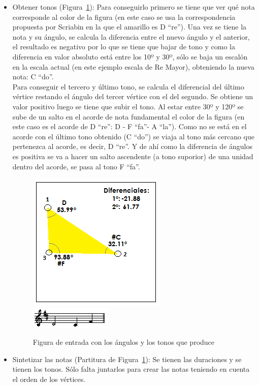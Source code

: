 \begin{itemize}
	\item Obtener tonos  (Figura~\ref{fig:Figura4Voz1}): Para conseguirlo primero se tiene que ver qué nota corresponde al color de la figura (en este caso se usa la correspondencia propuesta por Scriabin en la que el amarillo es D ``re''). Una vez se tiene la nota y su ángulo, se calcula la diferencia entre el nuevo ángulo y el anterior, el resultado es negativo por lo que se tiene que bajar de tono y como la diferencia en valor absoluto está entre los 10º y 30º, sólo se baja un escalón en la escala actual (en este ejemplo escala de Re Mayor), obteniendo la nueva nota: C ``do''. \\
Para conseguir el tercero y último tono, se calcula el diferencial del último vértice restando el ángulo del tercer vértice con el del segundo. Se obtiene un valor positivo luego se tiene que subir el tono. Al estar entre 30º y 120º se sube de un salto en el acorde de nota fundamental el color de la figura (en este caso es el acorde de D ``re'': D - F ``fa''- A ``la''). Como no se está en el acorde con el último tono obtenido (C ``do'') se viaja al tono más cercano que pertenezca al acorde, es decir, D ``re''. Y de ahí como la diferencia de ángulos es positiva se va a hacer un salto ascendente (a tono suporior) de una unidad dentro del acorde, se pasa al tono F ``fa''.
	
		\begin{figure}[htbp]
		\centering
		\hspace*{0.0in}
		\includegraphics[scale=1.0]{graphics/simpletest1-F3.png}
		\includegraphics[scale=1.0]{graphics/simpletest1-MELpartitura.png}
		\caption{Figura de entrada con los ángulos y los tonos que produce}
		\label{fig:Figura4Voz1}
		\end{figure}

	\item Sintetizar las notas (Partitura de Figura~\ref{fig:Figura4Voz1}): Se tienen las duraciones y se tienen los tonos. Sólo falta juntarlos para crear las notas teniendo en cuenta el orden de los vértices.\\

\end{itemize}


